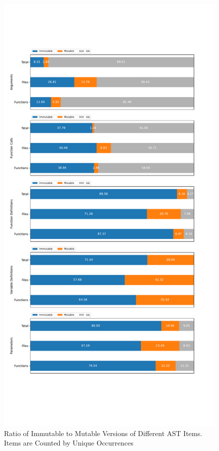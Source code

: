 \documentclass[11pt]{article}
\begin{document}
\begin{appendices}
\begin{figure}[H]
	\centering
	\includegraphics[width=0.9\linewidth, clip, trim={0.5cm 6cm 0.5cm 6cm}]{../mutability_by_category.pdf}
	\caption{Ratio of Immutable to Mutable Versions of Different AST Items. Items are Counted by Unique Occurrences}
	\label{fig:mutabillity_by_category}
\end{figure}


\end{appendices}


\printbibliography
\end{document}
